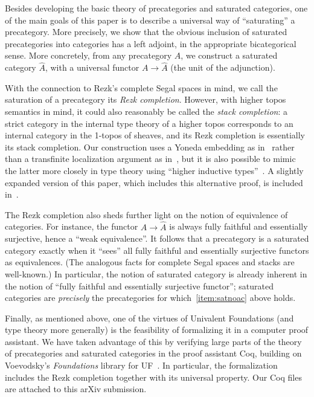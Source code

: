 \documentclass{amsart}
\theoremstyle{definition}
\theoremstyle{remark}
\numberwithin{equation}{section}
\begin{document}
Besides developing the basic theory of precategories and saturated categories, one of the main goals of this paper is to describe a universal way of ``saturating'' a precategory.
More precisely, we show that the obvious inclusion of saturated precategories into categories has a left adjoint, in the appropriate bicategorical sense.
More concretely, from any precategory $A$, we construct a saturated category $\widehat{A}$, with a universal functor
$A \to \widehat{A}$ (the unit of the adjunction).

With the connection to Rezk's complete Segal spaces in mind, we call the saturation of a precategory its \emph{Rezk completion}.
However, with higher topos semantics in mind, it could also reasonably be called the \emph{stack completion}: a strict category in the internal type theory of a higher topos corresponds to an internal category in the 1-topos of sheaves, and its Rezk completion is essentially its stack completion.
Our construction uses a Yoneda embedding as in~\cite{bunge:stacks-morita-internal} rather than a transfinite localization argument as in~\cite{jt:strong-stacks,rezk01css}, but it is also possible to mimic the latter more closely in type theory using ``higher inductive types''~\cite{ls:hits}.
A slightly expanded version of this paper, which includes this alternative proof, is included in~\cite[Chapter 9]{HoTTbook}.

The Rezk completion also sheds further light on the notion of equivalence of categories.
For instance, the functor $A \to \widehat{A}$ is always fully faithful and essentially surjective, hence a ``weak equivalence''.
It follows that a precategory is a saturated category exactly when it ``sees'' all fully faithful and essentially surjective functors as equivalences.
(The analogous facts for complete Segal spaces and stacks are well-known.)
In particular, the notion of saturated category is already inherent in the notion of ``fully faithful and essentially surjective functor''; saturated categories are \emph{precisely} the precategories for which~\ref{item:satnoac} above holds.

Finally, as mentioned above, one of the virtues of Univalent Foundations (and type theory more generally) is the feasibility of formalizing it in a computer proof assistant.
We have taken advantage of this by verifying large parts of the theory of precategories and saturated categories in the proof assistant \textsf{Coq}, building on Voevodsky's \emph{Foundations} library for UF~\cite{vv_foundations}.
In particular, the formalization includes the Rezk completion together with its universal property.
Our \textsf{Coq} files are attached to this arXiv submission.
\end{document}
